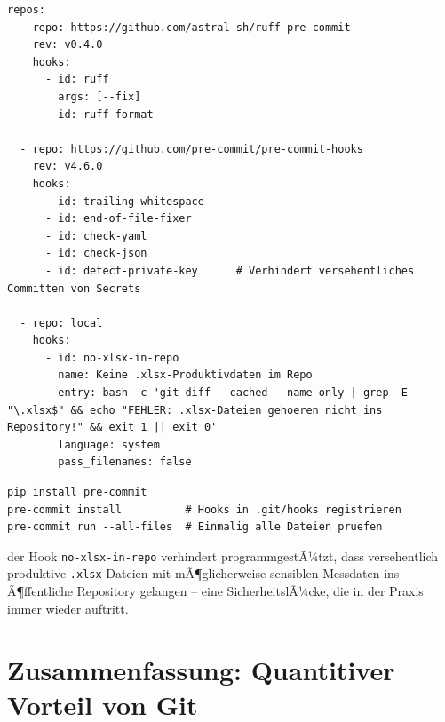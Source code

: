 ﻿\documentclass[12pt,a4paper]{report}
\theoremstyle{definition}
\theoremstyle{remark}
\newcommand{\code}[1]{\texttt{#1}}
\begin{document}
\begin{lstlisting}[style=yaml, caption={.pre-commit-config.yaml -- Lokale Qualitaetssicherung}]
repos:
  - repo: https://github.com/astral-sh/ruff-pre-commit
    rev: v0.4.0
    hooks:
      - id: ruff
        args: [--fix]
      - id: ruff-format

  - repo: https://github.com/pre-commit/pre-commit-hooks
    rev: v4.6.0
    hooks:
      - id: trailing-whitespace
      - id: end-of-file-fixer
      - id: check-yaml
      - id: check-json
      - id: detect-private-key      # Verhindert versehentliches Committen von Secrets

  - repo: local
    hooks:
      - id: no-xlsx-in-repo
        name: Keine .xlsx-Produktivdaten im Repo
        entry: bash -c 'git diff --cached --name-only | grep -E "\.xlsx$" && echo "FEHLER: .xlsx-Dateien gehoeren nicht ins Repository!" && exit 1 || exit 0'
        language: system
        pass_filenames: false
\end{lstlisting}

\begin{lstlisting}[style=bash, caption={pre-commit installieren und aktivieren}]
pip install pre-commit
pre-commit install          # Hooks in .git/hooks registrieren
pre-commit run --all-files  # Einmalig alle Dateien pruefen
\end{lstlisting}

der Hook \code{no-xlsx-in-repo} verhindert programmgestÃ¼tzt, dass
versehentlich produktive \code{.xlsx}-Dateien mit mÃ¶glicherweise
sensiblen Messdaten ins Ã¶ffentliche Repository gelangen --
eine SicherheitslÃ¼cke, die in der Praxis immer wieder auftritt.

\section{Zusammenfassung: Quantitiver Vorteil von Git}
\end{document}
